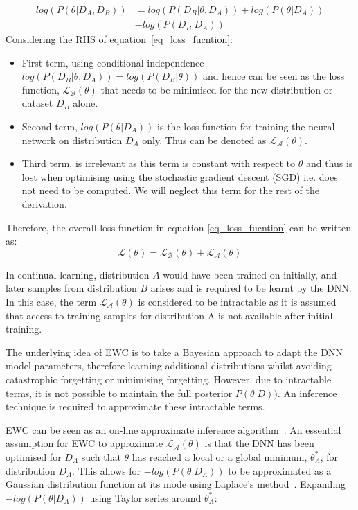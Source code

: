 \begin{equation}\label{eq_loss_fucntion}
\begin{split}
log(P(\theta|D_A,D_B))&=log(P(D_B|\theta,D_A))+log(P(\theta|D_A)) 
\\
& - log(P(D_B|D_A))
\end{split}
\end{equation}
Considering the RHS of equation~\ref{eq_loss_fucntion}:
\begin{itemize}
    \item First term, using conditional independence $log(P(D_B|\theta,D_A)) = log(P(D_B|\theta))$ and hence can be seen as the loss function, $\mathcal{L_B}(\theta)$ that needs to be minimised for the new distribution or dataset $D_B$ alone.
%
    \item Second term, $log(P(\theta|D_A))$ is the loss function for training the neural network on distribution $D_A$ only. Thus can be denoted as $\mathcal{L_A}(\theta)$. 
%
    \item  Third term, is irrelevant as this term is constant with respect to $\theta$ and thus is lost when optimising using the stochastic gradient descent (SGD) i.e. does not need to be computed. We will neglect this term for the rest of the derivation.
\end{itemize}
%
Therefore, the overall loss function in equation \ref{eq_loss_fucntion} can be written as:
%
\begin{equation}\label{eq_loss_fucntion_short}
\mathcal{L}(\theta)=\mathcal{L_B}(\theta)+\mathcal{L_A}(\theta)
\end{equation}

In continual learning, distribution $A$ would have been trained on initially, and later samples from distribution $B$ arises and is required to be learnt by the DNN.
%
In this case, the term $\mathcal{L_A}(\theta)$ is considered to be intractable as it is assumed that access to training samples for distribution A is not available after initial training.

The underlying idea of EWC is to take a Bayesian approach to adapt the DNN model parameters, therefore learning additional distributions whilst avoiding catastrophic forgetting or minimising forgetting. 
%
However, due to intractable terms, it is not possible to maintain the full posterior $P(\theta|D))$.
%
An inference technique is required to approximate these intractable terms. 

EWC can be seen as an on-line approximate inference algorithm~\cite{Huszar2018}.
%
An essential assumption for EWC to approximate $\mathcal{L_A}(\theta)$ is that the DNN has been optimised for $D_A$ such that $\theta$ has reached a local or a global minimum, $\theta^{*}_{A}$, for distribution $D_A$.
%
This allows for $-log(P(\theta|D_A))$ to be approximated as a Gaussian distribution function at its mode using Laplace's method~\cite{MacKay2003}. 
%
Expanding $-log(P(\theta|D_A))$ using Taylor series around $\theta^{*}_{A}$: 


